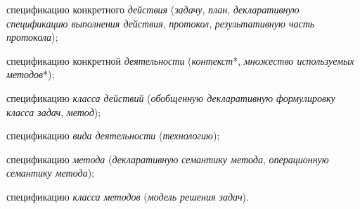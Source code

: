 \begin{SCn}
\begin{scnindent}
{	        \begin{scnitemize}
	            \item спецификацию конкретного \textit{действия} (\textit{задачу}, \textit{план}, \textit{декларативную спецификацию выполнения действия}, \textit{протокол}, \textit{результативную часть протокола});
	            \item спецификацию конкретной \textit{деятельности} (\textit{контекст}*, \textit{множество используемых методов}*);
	            \item спецификацию \textit{класса действий} (\textit{обобщенную декларативную формулировку класса задач}, \textit{метод});
	            \item спецификацию \textit{вида деятельности} (\textit{технологию});
	            \item спецификацию \textit{метода} (\textit{декларативную семантику метода}, \textit{операционную семантику метода});
	            \item спецификацию \textit{класса методов} (\textit{модель решения задач}).
	        \end{scnitemize}}
    \end{scnindent}
    
    \begin{scnhaselementset}
    \end{scnhaselementset}
    
    \bigskip
    

\end{SCn}

